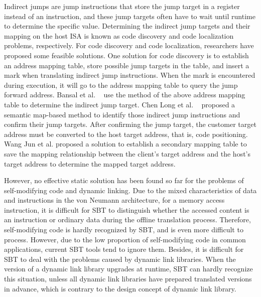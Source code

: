 Indirect jumps are jump instructions that store the jump target in a register instead of an instruction, and these jump targets often have to wait until runtime to determine the specific value.
Determining the indirect jump targets and their mapping on the host ISA is known as code discovery and code localization problems, respectively. 
For code discovery and code localization, researchers have proposed some feasible solutions. 
One solution for code discovery is to establish an address mapping table, store possible jump targets in the table, and insert a mark when translating indirect jump instructions.
When the mark is encountered during execution, it will go to the address mapping table to query the jump forward address.
Bansal et al. ~\cite{bansal2008binary} use the method of the above address mapping table to determine the indirect jump target.
Chen Long et al. ~\cite{chenlong2008} proposed a semantic map-based method to identify those indirect jump instructions and confirm their jump targets.
After confirming the jump target, the customer target address must be converted to the host target address, that is, code positioning.
Wang Jun et al. \cite{wangjun2019} proposed a solution to establish a secondary mapping table to save the mapping relationship between the client's target address and the host's target address to determine the mapped target address.

However, no effective static solution has been found so far for the problems of self-modifying code and dynamic linking.
Due to the mixed characteristics of data and instructions in the von Neumann architecture, for a memory access instruction, it is difficult for SBT to distinguish whether the accessed content is an instruction or ordinary data during the offline translation process.
Therefore, self-modifying code is hardly recognized by SBT, and is even more difficult to process.
However, due to the low proportion of self-modifying code in common applications, current SBT tools tend to ignore them.
Besides, it is difficult for SBT to deal with the problems caused by dynamic link libraries.
When the version of a dynamic link library upgrades at runtime, SBT can hardly recognize this situation, unless all dynamic link libraries have prepared translated versions in advance, which is contrary to the design concept of dynamic link library.

